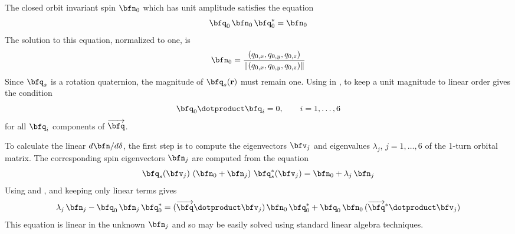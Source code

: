 {The closed orbit invariant spin $\bfn_0$ which has unit amplitude satisfies the equation
\begin{equation}
  \bfq_0 \, \bfn_0 \, \bfq_0^* = \bfn_0
  \label{qnqn}
\end{equation}
The solution to this equation, normalized to one, is
\begin{equation}
  \bfn_0 = \frac{(q_{0,x}, q_{0,y}, q_{0,z})}{\|(q_{0,x}, q_{0,y}, q_{0,z})\|}
  \label{nkqqq}
\end{equation}
Since $\bfq_s$ is a rotation quaternion, the magnitude of $\bfq_s(\bfr)$ must remain one. Using
 in , to keep a unit magnitude to linear order gives the condition
\begin{equation}
  \bfq_0 \dotproduct \bfq_i = 0, \qquad i = 1, \ldots, 6
\end{equation}
for all $\bfq_i$ components of $\overrightarrow{\bfq}$.

To calculate the linear $d\bfn/d\delta$, the first step is to compute the eigenvectors $\bfv_j$ and
eigenvalues $\lambda_j$, $j = 1, \ldots, 6$ of the 1-turn orbital matrix. The
corresponding spin eigenvectors $\bfn_j$ are computed from the equation
\begin{equation}
  \bfq_s(\bfv_j) \,\, (\bfn_0 + \bfn_j) \,\, \bfq_s^*(\bfv_j) = \bfn_0 + \lambda_j \, \bfn_j
  \label{qnnq}
\end{equation}
Using  and , and keeping only linear terms gives
\begin{equation}
  \lambda_j \, \bfn_j - \bfq_0 \, \bfn_j \, \bfq_0^* = 
  (\overrightarrow{\bfq} \dotproduct \bfv_j) \, \bfn_0 \, \bfq_0^* + 
  \bfq_0 \, \bfn_0 \, (\overrightarrow{\bfq}^* \dotproduct \bfv_j)
  \label{lnqnq}
\end{equation}
This equation is linear in the unknown $\bfn_j$ and so may be easily solved using standard linear
algebra techniques.

}

